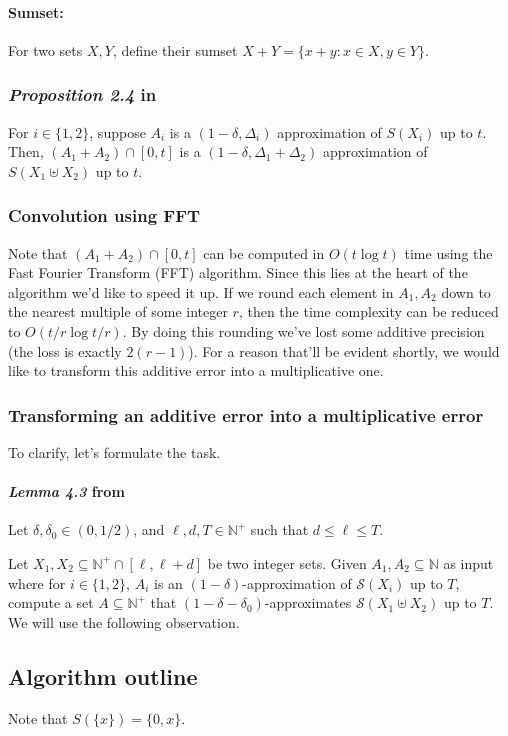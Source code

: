 \paragraph{Sumset:}
For two sets \( X, Y \), define their sumset \( X + Y = \{x + y : x \in X, y \in Y\} \).


\subsubsection{\textit{Proposition 2.4} in \cite{deng}} 

For \(i \in \{1, 2\}\), suppose \(A_i\) is a \((1 - \delta, \Delta_i)\) approximation of \(S(X_i)\) up to \(t\). Then, \((A_1 + A_2) \cap [0, t]\) is a \((1 - \delta, \Delta_1 + \Delta_2)\) approximation of \(S(X_1 \uplus X_2)\) up to \(t\). \\

\subsubsection{Convolution using FFT}

Note that \((A_1 + A_2) \cap [0, t]\) can be computed in \(O(t \log t)\) time using the Fast Fourier Transform (FFT) algorithm. Since this lies at the heart of the algorithm we'd like to speed it up. If we round each element in \(A_1, A_2\) down to the nearest multiple of some integer $r$, then the time complexity can be reduced to \(O(t / r \log t / r)\). 
By doing this rounding we've lost some additive precision (the loss is exactly $2(r-1)$).  For a reason that'll be evident shortly, we would like to transform this additive error into a multiplicative one. 

\subsubsection{Transforming an additive error into a multiplicative error}
To clarify, let's formulate the task. 
\paragraph{\textit{Lemma 4.3} from \cite{deng}} Let \(\delta, \delta_0 \in (0, 1/2)\), and \(\ell, d, T \in \mathbb{N}^+\) such that \(d \leq \ell \leq T\).

Let \(X_1, X_2 \subseteq \mathbb{N}^+ \cap [\ell, \ell + d]\) be two integer sets. Given \(A_1, A_2 \subseteq \mathbb{N}\) as input where for \(i \in \{1, 2\}\), \(A_i\) is an \((1 - \delta)\)-approximation of \(\mathcal{S}(X_i)\) up to \(T\), compute a set \(A \subseteq \mathbb{N}^+\) that \((1 - \delta - \delta_0)\)-approximates \(\mathcal{S}(X_1 \uplus X_2)\) up to \(T\). \\

We will use the following observation.



\subsection{Algorithm outline}
Note that \( S(\{x\}) = \{0, x\}\). 